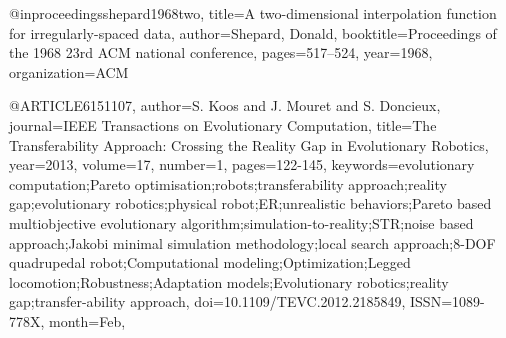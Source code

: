@inproceedings{shepard1968two,
  title={A two-dimensional interpolation function for irregularly-spaced data},
  author={Shepard, Donald},
  booktitle={Proceedings of the 1968 23rd ACM national conference},
  pages={517--524},
  year={1968},
  organization={ACM}
}

@ARTICLE{6151107, 
author={S. {Koos} and J. {Mouret} and S. {Doncieux}}, 
journal={IEEE Transactions on Evolutionary Computation}, 
title={The Transferability Approach: Crossing the Reality Gap in Evolutionary Robotics}, 
year={2013}, 
volume={17}, 
number={1}, 
pages={122-145}, 
keywords={evolutionary computation;Pareto optimisation;robots;transferability approach;reality gap;evolutionary robotics;physical robot;ER;unrealistic behaviors;Pareto based multiobjective evolutionary algorithm;simulation-to-reality;STR;noise based approach;Jakobi minimal simulation methodology;local search approach;8-DOF quadrupedal robot;Computational modeling;Optimization;Legged locomotion;Robustness;Adaptation models;Evolutionary robotics;reality gap;transfer-ability approach}, 
doi={10.1109/TEVC.2012.2185849}, 
ISSN={1089-778X}, 
month={Feb},}
